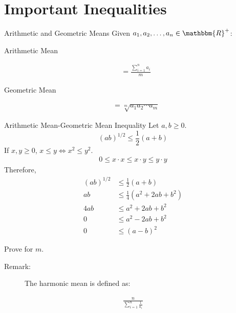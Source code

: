 \documentclass[10pt]{extarticle}
\newcommand{\R}{\mathbbm{R}}
\begin{document}
  \section{Important Inequalities}%
  \begin{problem}{Arithmetic and Geometric Means}
    Given $a_1,a_2,\dots,a_n\in \R^+$:
    \begin{description}
      \item[Arithmetic Mean]
    \end{description}
    \begin{align*}
      &= \frac{\sum_{i =1}^{n} a_i}{m}
    \end{align*}
    \begin{description}
      \item[Geometric Mean]
    \end{description}
    \begin{align*}
      &= \sqrt[m]{a_1a_2\cdots a_m}
    \end{align*}
    \begin{problem}{Arithmetic Mean-Geometric Mean Inequality}
      Let $a,b \geq 0$.
      \[
        (ab)^{1/2} \leq \frac{1}{2}(a+b)
      \] 
      \tcblower
      If $x,y \geq 0$, $x\leq y \Leftrightarrow x^2 \leq y^2$.
      \begin{align*}
          0 \leq x\cdot x \leq x \cdot y \leq y\cdot y\tag*{by property (ii) of ordered fields}
      \end{align*}
      Therefore,  
      \begin{align*}
        (ab)^{1/2}&\leq \frac{1}{2}(a+b)\\
        ab &\leq \frac{1}{4}(a^2 + 2ab + b^2)\\
        4ab &\leq a^2 + 2ab + b^2 \\
        0 &\leq a^2 - 2ab + b^2\\
        0 &\leq (a-b)^2 \tag*{by definition}
      \end{align*}
      \begin{description}
        \small
        \item[Challenge:] Prove for $m$.
      \end{description}
    \end{problem}
    \begin{description}
      \item[Remark:] The harmonic mean is defined as:
    \end{description}
    \begin{align*}
      \frac{n}{\displaystyle\sum_{i=1}^{n}\frac{1}{a_i}}
    \end{align*}
  \end{problem}
\end{document}
